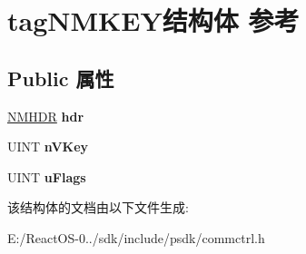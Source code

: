 \hypertarget{structtag_n_m_k_e_y}{}\section{tag\+N\+M\+K\+E\+Y结构体 参考}
\label{structtag_n_m_k_e_y}
\subsection*{Public 属性}
\begin{DoxyCompactItemize}
\item 
\mbox{\label{structtag_n_m_k_e_y_a363fcf59a3d3feaca7a4c841dfc00c7f}} 
\hyperlink{structtag_n_m_h_d_r}{N\+M\+H\+DR} {\bfseries hdr}
\item 
\mbox{\label{structtag_n_m_k_e_y_af8b2e1caae0b1ce61e3d0f51acf69e7b}} 
U\+I\+NT {\bfseries n\+V\+Key}
\item 
\mbox{\label{structtag_n_m_k_e_y_abb29e1885003b29293f8358ba18eb9ca}} 
U\+I\+NT {\bfseries u\+Flags}
\end{DoxyCompactItemize}


该结构体的文档由以下文件生成\+:\begin{DoxyCompactItemize}
\item 
E\+:/\+React\+O\+S-\/0../sdk/include/psdk/commctrl.\+h\end{DoxyCompactItemize}
